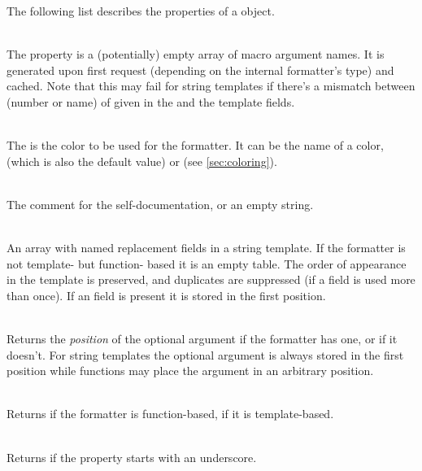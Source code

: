 \documentclass[12pt]{scrartcl}
\begin{document}
The following list describes the properties of a  object.

\begin{itemize*}
\item {}\\
The  property is a (potentially) empty array of macro argument
names.  It is generated upon first request (depending on the internal
formatter's type) and cached.  Note that this may fail for string templates if
there's a mismatch between (number or name) of  given in the
 and the template fields.

\item {}\\
The  is the color to be used for the formatter. It can be the
name of a color,  (which is also the default value) or
 (see  \vref{sec:coloring}).

\item {}\\
The comment for the self-documentation, or an empty string.

\item {}\\
An array with named replacement fields in a string template.  If the formatter
is not template- but function- based it is an empty table.  The order of
appearance in the template is preserved, and duplicates are suppressed (if a
field is used more than once).  If an  field is present it
is stored in the first position.

\item {}\\
Returns the \emph{position} of the optional argument if the formatter has one,
or  if it doesn't.  For string templates the optional argument is
always stored in the first position while functions may place the
 argument in an arbitrary position.

\item {}\\
Returns  if the formatter is function-based,  if it
is template-based.

\item {}\\
Returns  if the  property starts with an underscore.


\end{itemize*}
\end{document}
